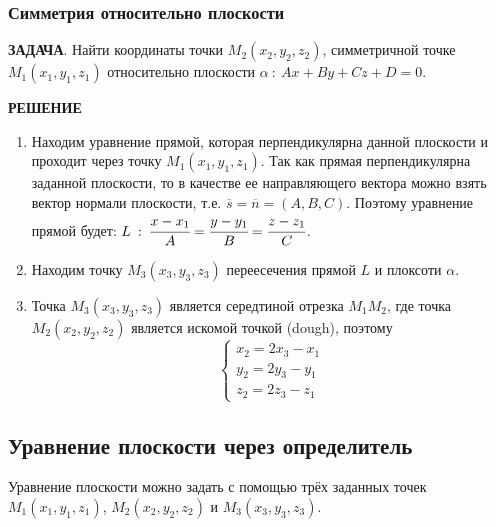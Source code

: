 \documentclass{article}
\begin{document}
\subsubsection{Симметрия относительно плоскости}
\textbf{ЗАДАЧА}. Найти координаты точки $M_2(x_2,y_2,z_2)$, симметричной точке $M_1(x_1,y_1,z_1)$ относительно плоскости $\alpha\::\:Ax+By+Cz+D=0$.

\textbf{РЕШЕНИЕ}
\begin{enumerate}
    \item Находим уравнение прямой, которая перпендикулярна данной плоскости и проходит через точку $M_1(x_1,y_1,z_1)$. Так как прямая перпендикулярна заданной плоскости, то в качестве ее направляющего вектора можно взять вектор нормали плоскости, т.е. $\overline{s}=\overline{n}=(A,B,C)$. Поэтому уравнение прямой будет: $L\::\:\cfrac{x-x_1}{A}=\cfrac{y-y_1}{B}=\cfrac{z-z_1}{C}$.
    \item Находим точку $M_3(x_3,y_3,z_3)$ переесечения прямой $L$ и плоксоти $\alpha$.
    \item Точка $M_3(x_3,y_3,z_3)$ является середтиной отрезка $M_1M_2$, где точка $M_2(x_2,y_2,z_2)$ является искомой точкой (dough), поэтому 
    $$ \begin{cases}x_2=2x_3-x_1\\y_2=2y_3-y_1\\z_2=2z_3-z_1 \end{cases} $$
\end{enumerate}

\newpage
\subsection{Уравнение плоскости через определитель}
Уравнение плоскости можно задать с помощью трёх заданных точек $M_1(x_1,y_1,z_1)$, $M_2(x_2,y_2,z_2)$ и $M_3(x_3,y_3,z_3)$.
\end{document}
